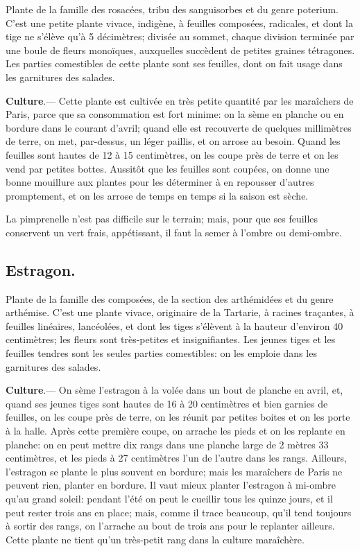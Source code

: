 \documentclass[10pt,a4paper]{book}
\begin{document}
Plante de la famille des rosacées, tribu des sanguisorbes et du genre poterium. C'est une petite plante vivace, indigène, à feuilles composées, radicales, et dont la tige ne s'élève qu'à 5 décimètres; divisée au sommet, chaque division terminée par une boule de fleurs monoïques, auxquelles succèdent de petites graines tétragones. Les parties comestibles de cette plante sont ses feuilles, dont on fait usage dans les garnitures des salades.

\textbf{Culture}.--- Cette plante est cultivée en très petite quantité par les maraîchers de Paris, parce que sa consommation est fort minime: on la sème en planche ou en bordure dans le courant d'avril; quand elle est recouverte de quelques millimètres de terre, on met, par-dessus, un léger paillis, et on arrose au besoin. Quand les feuilles sont hautes de 12 à 15 centimètres, on les coupe près de terre et on les vend par petites bottes. Aussitôt que les feuilles sont coupées, on donne une bonne mouillure aux plantes pour les déterminer à en repousser d'autres promptement, et on les arrose de temps en temps si la saison est sèche.

La pimprenelle n'est pas difficile sur le terrain; mais, pour que ses feuilles conservent un vert frais, appétissant, il faut la semer à l'ombre ou demi-ombre.

\subsection{Estragon.}

Plante de la famille des composées, de la section des arthémidées et du genre arthémise. C'est une plante vivace, originaire de la Tartarie, à racines traçantes, à feuilles linéaires, lancéolées, et dont les tiges s'élèvent à la hauteur d'environ 40 centimètres; les fleurs sont très-petites et insignifiantes. Les jeunes tiges et les feuilles tendres sont les seules parties comestibles: on les emploie dans les garnitures des salades.

\textbf{Culture}.--- On sème l'estragon à la volée dans un bout de planche en avril, et, quand ses jeunes tiges sont hautes de 16 à 20 centimètres et bien garnies de feuilles, on les coupe près de terre, on les réunit par petites boites et on les porte à la halle. Après cette première coupe, on arrache les pieds et on les replante en planche: on en peut mettre dix rangs dans une planche large de 2 mètres 33 centimètres, et les pieds à 27 centimètres l'un de l'autre dans les rangs. Ailleurs, l'estragon se plante le plus souvent en bordure; mais les maraîchers de Paris ne peuvent rien, planter en bordure. Il vaut mieux planter l'estragon à mi-ombre qu'au grand soleil: pendant l'été on peut le cueillir tous les quinze jours, et il peut rester trois ans en place; mais, comme il trace beaucoup, qu'il tend toujours à sortir des rangs, on l'arrache au bout de trois ans pour le replanter ailleurs. Cette plante ne tient qu'un très-petit rang dans la culture maraîchère.
\end{document}
